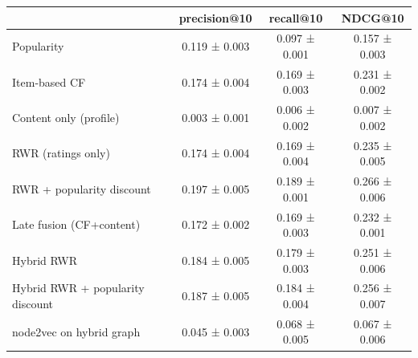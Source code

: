 \begin{tabular}{lccc}
\toprule
 & precision@10 & recall@10 & NDCG@10 \\
\midrule
Popularity & 0.119 ± 0.003 & 0.097 ± 0.001 & 0.157 ± 0.003 \\
Item-based CF & 0.174 ± 0.004 & 0.169 ± 0.003 & 0.231 ± 0.002 \\
Content only (profile) & 0.003 ± 0.001 & 0.006 ± 0.002 & 0.007 ± 0.002 \\
RWR (ratings only) & 0.174 ± 0.004 & 0.169 ± 0.004 & 0.235 ± 0.005 \\
RWR + popularity discount & 0.197 ± 0.005 & 0.189 ± 0.001 & 0.266 ± 0.006 \\
Late fusion (CF+content) & 0.172 ± 0.002 & 0.169 ± 0.003 & 0.232 ± 0.001 \\
Hybrid RWR & 0.184 ± 0.005 & 0.179 ± 0.003 & 0.251 ± 0.006 \\
Hybrid RWR + popularity discount & 0.187 ± 0.005 & 0.184 ± 0.004 & 0.256 ± 0.007 \\
node2vec on hybrid graph & 0.045 ± 0.003 & 0.068 ± 0.005 & 0.067 ± 0.006 \\
\bottomrule
\end{tabular}
